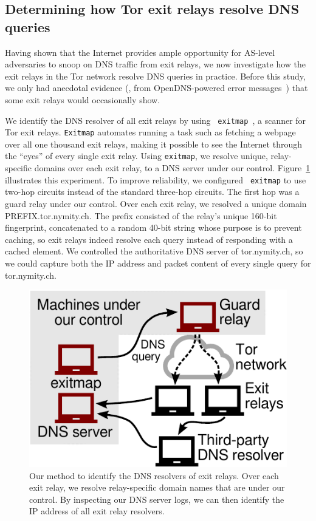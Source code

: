 \subsection{Determining how Tor exit relays resolve DNS queries}
\label{sec:mapping-resolvers}

Having shown that the Internet provides ample opportunity for
AS-level adversaries to snoop on DNS traffic from exit relays, we
now investigate how the exit relays in the Tor network resolve DNS
queries in practice. Before this study,
we only had anecdotal evidence (\eg, from OpenDNS-powered error
messages~\cite[\S~4.1]{Winter2014b}) that some exit relays would occasionally
show.

We identify the DNS resolver of all exit relays by using {\tt
exitmap}~\cite{exitmap}, a scanner for Tor exit relays.  {\tt Exitmap} automates
running a task such as fetching a webpage over all one thousand exit relays,
making it possible to see the Internet through the ``eyes'' of every single exit
relay.  Using {\tt exitmap}, we resolve unique, relay-specific domains over each
exit relay, to a DNS server under our control.  Figure~\ref{fig:dnsenum}
illustrates this experiment.  To improve reliability, we configured {\tt
exitmap} to use two-hop circuits instead of the standard three-hop circuits.
The first hop was a guard relay under our control.  Over each exit relay, we
resolved a unique domain PREFIX.tor.nymity.ch.  The prefix consisted of
the relay's unique 160-bit fingerprint, concatenated to a random 40-bit string
whose purpose is to prevent caching, so exit relays indeed resolve each query
instead of responding with a cached element.  We controlled the authoritative
DNS server of tor.nymity.ch, so we could capture both the IP address and
packet content of every single query for tor.nymity.ch.

\begin{figure}[t]
	\centering
	\includegraphics[width=0.6\linewidth]{figures/resolver-identification.pdf}
	\caption{Our method to identify the DNS resolvers of exit relays.  Over
	each exit relay, we resolve relay-specific domain names that are under our
	control.  By inspecting our DNS server logs, we can then identify the IP
	address of all exit relay resolvers.}
	\label{fig:dnsenum}
\end{figure}

